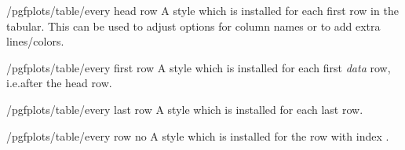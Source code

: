 \documentclass[a4paper]{ltxdoc}
\begin{document}
\begin{stylekey}{/pgfplots/table/every head row}
    A style which is installed for each first row in the tabular. This can be
    used to adjust options for column names or to add extra lines/colors.

\begin{codeexample}[]
\end{codeexample}
\end{stylekey}

\begin{stylekey}{/pgfplots/table/every first row}
    A style which is installed for each first \emph{data} row, i.e.\@ after the
    head row.
\end{stylekey}

\begin{stylekey}{/pgfplots/table/every last row}
    A style which is installed for each last row.
\end{stylekey}

\begin{stylekey}{/pgfplots/table/every row no }
    A style which is installed for the row with index .
\end{stylekey}
\end{document}
